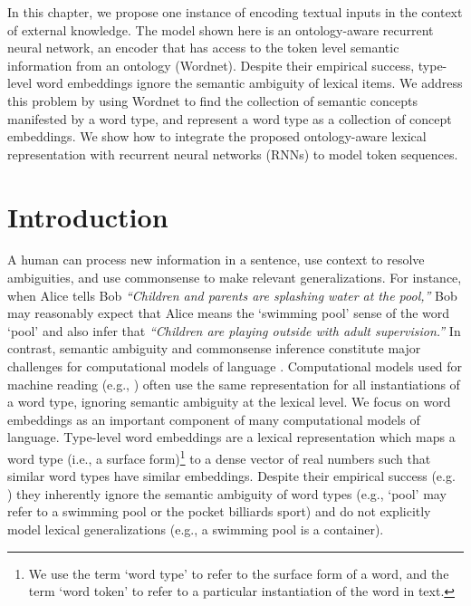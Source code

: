 In this chapter, we propose one instance of encoding textual inputs in the context of external knowledge. The model shown here is an ontology-aware recurrent neural network, an encoder that has access to the token level semantic information from an ontology (Wordnet).
Despite their empirical success, type-level word embeddings ignore the semantic ambiguity of lexical items. We address this problem by using Wordnet to find the collection of semantic concepts manifested by a word type, and represent a word type as a collection of concept embeddings. We show
how to integrate the proposed ontology-aware lexical representation with recurrent neural networks (RNNs) to model token sequences. 

\section{Introduction}
A human can process new information in a sentence, use context to resolve ambiguities, and use commonsense to make relevant generalizations.
For instance, when Alice tells Bob \textit{``Children and parents are splashing water at the pool,''} Bob may reasonably expect that Alice means the `swimming pool' sense of the word `pool' and also infer that \textit{``Children are playing outside with adult supervision.''}
In contrast, semantic ambiguity and commonsense inference constitute major challenges for computational models of language \citep{yarowsky:94,tanaka:07,celikyilmaz:13,pasca:14}.
Computational models used for machine reading (e.g., \cite{bowman:15}) often use the same representation for all instantiations of a word type, ignoring semantic ambiguity at the lexical level.  We focus on word embeddings as an important component of many computational models of language.
Type-level word embeddings are a lexical representation which maps a word type (i.e., a surface form)\footnote{We use the term `word type' to refer to the surface form of a word, and the term `word token' to refer to a particular instantiation of the word in text.} 
to a dense vector of real numbers such that similar word types have similar embeddings. 
Despite their empirical success (e.g. \cite{socher:10}) they inherently ignore the semantic ambiguity of word types (e.g., `pool' may refer to a swimming pool or the pocket billiards sport)  and do not explicitly model lexical generalizations (e.g., a swimming pool is a container).

